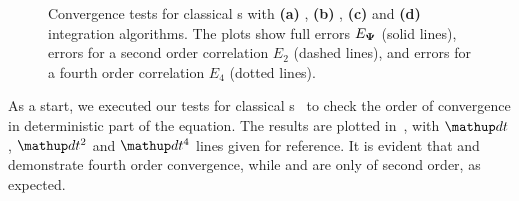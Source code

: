 \begin{figure}
    \caption[Convergence tests, s]{
    Convergence tests for classical s with \textbf{(a)} , \textbf{(b)} , \textbf{(c)}  and \textbf{(d)}  integration algorithms.
    The plots show full errors $E_{\mathbf{\Psi}}$ (solid lines), errors for a second order correlation $E_2$ (dashed lines), and errors for a fourth order correlation $E_4$ (dotted lines).
    }%

    \label{fig:numerical:convergence-gpe}
\end{figure}

As a start, we executed our tests for classical s~ to check the order of convergence in deterministic part of the equation.
The results are plotted in~, with $\upd t$, $\upd t^2$ and $\upd t^4$ lines given for reference.
It is evident that  and  demonstrate fourth order convergence, while  and  are only of second order, as expected.

